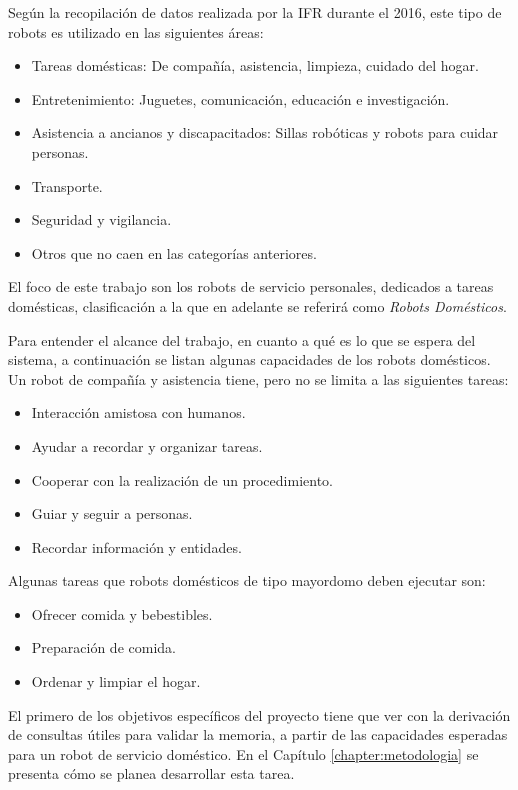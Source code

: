 Según la recopilación de datos realizada por la IFR durante el 2016, este tipo de robots es utilizado en las siguientes áreas:
\begin{itemize}[topsep=0pt]
\setlength\itemsep{0.2em}
\item Tareas domésticas: De compañía, asistencia, limpieza, cuidado del hogar.
\item Entretenimiento: Juguetes, comunicación, educación e investigación.
\item Asistencia a ancianos y discapacitados: Sillas robóticas y robots para cuidar personas.
\item Transporte.
\item Seguridad y vigilancia.
\item Otros que no caen en las categorías anteriores.
\end{itemize}
\bigskip

El foco de este trabajo son los robots de servicio personales, dedicados a tareas domésticas, clasificación a la que en  adelante se referirá como \textit{Robots Domésticos}.

Para entender el alcance del trabajo, en cuanto a qué es lo que se espera del sistema, a continuación se listan algunas capacidades de los robots domésticos. Un robot de compañía y asistencia tiene, pero no se limita a las siguientes tareas:
\begin{itemize}[topsep=0pt]
\setlength\itemsep{0.2em}
\item Interacción amistosa con humanos.
\item Ayudar a recordar y organizar tareas.
\item Cooperar con la realización de un procedimiento.
\item Guiar y seguir a personas.
\item Recordar información y entidades.
\end{itemize}
\bigskip

Algunas tareas que robots domésticos de tipo mayordomo deben ejecutar son:
\begin{itemize}[topsep=0pt]
\setlength\itemsep{0.2em}
\item Ofrecer comida y bebestibles.
\item Preparación de comida.
\item Ordenar y limpiar el hogar.
\end{itemize}
\bigskip

El primero de los objetivos específicos del proyecto tiene que ver con la derivación de consultas útiles para validar la memoria, a partir de las capacidades esperadas para un robot de servicio doméstico. En el Capítulo \ref{chapter:metodologia} se presenta cómo se planea desarrollar esta tarea.

